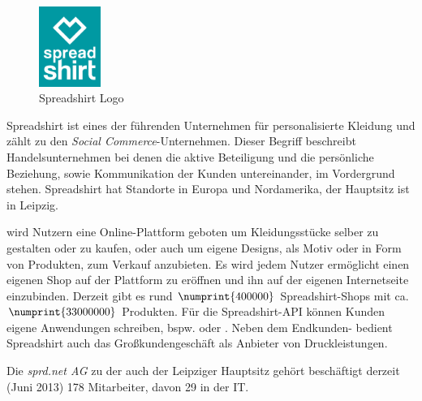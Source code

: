 
\begin{figure}[!htb]
	\centering
		\includegraphics[width=2cm]{resources/sprd_logo_cmyk}
	\caption{Spreadshirt Logo}
	\label{fig:spreadshirtLogo}
\end{figure}

Spreadshirt ist eines der führenden Unternehmen für personalisierte Kleidung und zählt zu den \emph{Social Commerce}-Unternehmen. Dieser Begriff beschreibt Handelsunternehmen bei denen die aktive Beteiligung und die persönliche Beziehung, sowie Kommunikation der Kunden untereinander, im Vordergrund stehen. 
Spreadshirt hat Standorte in Europa und Nordamerika, der Hauptsitz ist in Leipzig. 

wird Nutzern eine Online-Plattform geboten um Kleidungsstücke selber zu gestalten oder zu kaufen, oder auch um eigene Designs, als Motiv oder in Form von Produkten, zum Verkauf anzubieten. 
Es wird jedem Nutzer ermöglicht einen eigenen Shop auf der Plattform zu eröffnen und ihn auf der eigenen Internetseite einzubinden. Derzeit gibt es rund $\numprint{400000}$ Spreadshirt-Shops mit ca. $\numprint{33000000}$ Produkten.
Für die Spreadshirt-API können Kunden eigene Anwendungen schreiben, bspw.  \cite{zufallsshirt} oder  \cite{soundslikecotton}.
Neben dem Endkunden- bedient Spreadshirt auch das Großkundengeschäft als Anbieter von Druckleistungen.

Die \emph{sprd.net AG} zu der auch der Leipziger Hauptsitz gehört beschäftigt derzeit (Juni 2013) 178 Mitarbeiter, davon 29 in der IT.